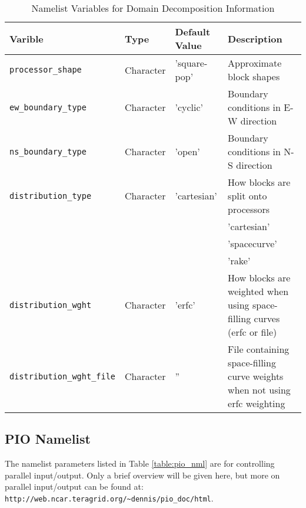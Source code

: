 \begin{table}
  \begin{center}
  \caption{Namelist Variables for Domain Decomposition Information}
  \label{table:domain_nml}
  \begin{tabular}{p{4.0cm}p{2cm}p{2cm}p{6.0cm}} \hline
  Varible & Type & Default Value & Description               \\
\hline \hline

{\tt processor\_shape} & Character & 'square-pop' & Approximate block shapes \\

{\tt ew\_boundary\_type} & Character & 'cyclic' & Boundary conditions in E-W direction\\

{\tt ns\_boundary\_type} & Character & 'open' & Boundary conditions in N-S direction\\

{\tt distribution\_type} & Character & 'cartesian' & How blocks are split onto processors \\
 & & & 'cartesian' \\
 & & & 'spacecurve' \\
 & & & 'rake' \\

{\tt distribution\_wght} & Character & 'erfc' & How blocks are weighted when using space-filling curves (erfc or file) \\

{\tt distribution\_wght\_file} & Character & '' & File containing space-filling curve weights when not using erfc weighting \\

  \hline
  \end{tabular}
  \end{center}
\end{table}

\subsection{PIO Namelist}

The namelist parameters listed in Table \ref{table:pio_nml} are for
controlling parallel input/output.  Only a brief overview will be
given here, but more on parallel input/output can be found at:\\

  {\tt http://web.ncar.teragrid.org/\~{}dennis/pio\_doc/html}.\\

